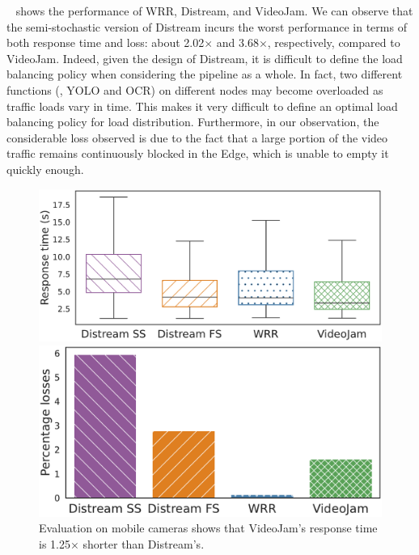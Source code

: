 ~ shows the performance of WRR, Distream, and VideoJam. We can observe that the semi-stochastic version of Distream incurs the worst performance in terms of both response time and loss: about 2.02$\times$ and 3.68$\times$, respectively, compared to VideoJam. Indeed, given the design of Distream, it is difficult to define the load balancing policy when considering the pipeline as a whole. In fact, two different functions (\eg, YOLO and OCR) on different nodes may become overloaded as traffic loads vary in time. This makes it very difficult to define an optimal load balancing policy for load distribution. Furthermore, in our observation, the considerable loss observed is due to the fact that a large portion of the video traffic remains continuously blocked in the Edge, which is unable to empty it quickly enough.

\begin{figure}
	\begin{minipage}[t]{.52\linewidth}
		\centering
		\includegraphics[width=\linewidth]{chapters/videojam/images/distream_vs_videojam/response_time.pdf}
	\end{minipage}
	\hfill
	\begin{minipage}[t]{.46\linewidth}
		\centering
		\includegraphics[width=\linewidth]{chapters/videojam/images/distream_vs_videojam/percentage_losses.pdf}
	\end{minipage}  
	\vspace{-1mm}
	\caption{Evaluation on mobile cameras shows that VideoJam's response time is 1.25$\times$ shorter than Distream's.}
	\vspace{-3mm}
	\label{fig:distream_vs_videojam}
\end{figure}


